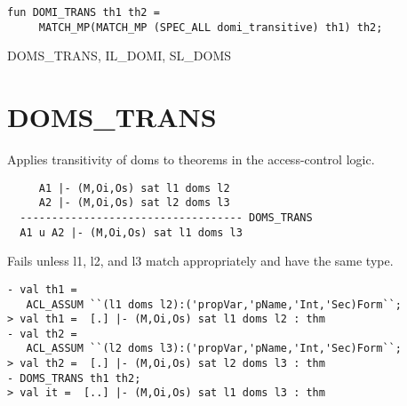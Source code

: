 \IMPLEMENTATION
\begin{holboxed}
\begin{verbatim}
fun DOMI_TRANS th1 th2 =
     MATCH_MP(MATCH_MP (SPEC_ALL domi_transitive) th1) th2;
\end{verbatim}
\end{holboxed}

\SEEALSO
DOMS\_TRANS, IL\_DOMI, SL\_DOMS
\ENDDOC

\section{DOMS\_TRANS}



\egroup

\SYNOPSIS
Applies transitivity of doms to theorems in the access-control logic.

\DESCRIBE

\begin{verbatim}
     A1 |- (M,Oi,Os) sat l1 doms l2   
     A2 |- (M,Oi,Os) sat l2 doms l3
  ----------------------------------- DOMS_TRANS
  A1 u A2 |- (M,Oi,Os) sat l1 doms l3
\end{verbatim}

\FAILURE
Fails unless l1, l2, and l3 match appropriately and have the
same type.

\EXAMPLE
\begin{holboxed}
\begin{verbatim}
- val th1 = 
   ACL_ASSUM ``(l1 doms l2):('propVar,'pName,'Int,'Sec)Form``;
> val th1 =  [.] |- (M,Oi,Os) sat l1 doms l2 : thm
- val th2 = 
   ACL_ASSUM ``(l2 doms l3):('propVar,'pName,'Int,'Sec)Form``;
> val th2 =  [.] |- (M,Oi,Os) sat l2 doms l3 : thm
- DOMS_TRANS th1 th2;
> val it =  [..] |- (M,Oi,Os) sat l1 doms l3 : thm
\end{verbatim}
\end{holboxed}


